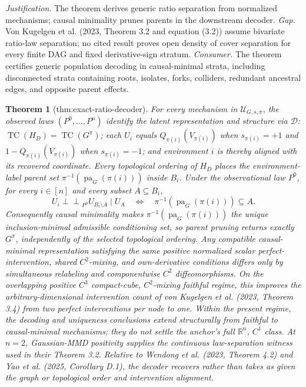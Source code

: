 \documentclass{article}
\newtheorem{theorem}{Theorem}
\begin{document}
\par\smallskip\noindent \textit{Justification.} The theorem derives generic ratio separation from normalized mechanisms; causal minimality prunes parents in the downstream decoder. \textit{Gap.} Von Kugelgen et al. (2023, Theorem 3.2 and equation (3.2)) assume bivariate ratio-law separation; no cited result proves open density of cover separation for every finite DAG and fixed derivative-sign stratum. \textit{Consumer.} The theorem certifies generic population decoding in causal-minimal strata, including disconnected strata containing roots, isolates, forks, colliders, redundant ancestral edges, and opposite parent effects.

\begin{theorem}[thm:exact-ratio-decoder]\label{thm:exact-ratio-decoder}
For every mechanism in \(\mathcal U_{G,s,\pi}\), the observed laws \((P^0,\ldots,P^n)\) identify the latent representation and structure via \(\mathscr D\): \(\operatorname{TC}(H_D)=\operatorname{TC}(G^\pi)\); each \(U_i\) equals \(Q_{\pi(i)}(V_{\pi(i)})\) when \(s_{\pi(i)}=+1\) and \(1-Q_{\pi(i)}(V_{\pi(i)})\) when \(s_{\pi(i)}=-1\); and environment \(i\) is thereby aligned with its recovered coordinate. Every topological ordering of \(H_D\) places the environment-label parent set \(\pi^{-1}(\operatorname{pa}_G(\pi(i)))\) inside \(B_i\). Under the observational law \(P^0\), for every \(i\in[n]\) and every subset \(A\subseteq B_i\), \[U_i\mathbin{\perp\!\!\!\perp}_{P^0}U_{B_i\setminus A}\mid U_A\quad\Longleftrightarrow\quad \pi^{-1}(\operatorname{pa}_G(\pi(i)))\subseteq A.\] Consequently causal minimality makes \(\pi^{-1}(\operatorname{pa}_G(\pi(i)))\) the unique inclusion-minimal admissible conditioning set, so parent pruning returns exactly \(G^\pi\), independently of the selected topological ordering. Any compatible causal-minimal representation satisfying the same positive normalized scalar perfect-intervention, shared \(C^2\)-mixing, and own-derivative conditions differs only by simultaneous relabeling and componentwise \(C^2\) diffeomorphisms. On the overlapping positive \(C^3\) compact-cube, \(C^2\)-mixing faithful regime, this improves the arbitrary-dimensional intervention count of von Kugelgen et al. (2023, Theorem 3.4) from two perfect interventions per node to one. Within the present regime, the decoding and uniqueness conclusions extend structurally from faithful to causal-minimal mechanisms; they do not settle the anchor's full \(\mathbb R^n\), \(C^1\) class. At \(n=2\), Gaussian-MMD positivity supplies the continuous law-separation witness used in their Theorem 3.2. Relative to Wendong et al. (2023, Theorem 4.2) and Yao et al. (2025, Corollary D.1), the decoder recovers rather than takes as given the graph or topological order and intervention alignment.
\end{theorem}
\end{document}
